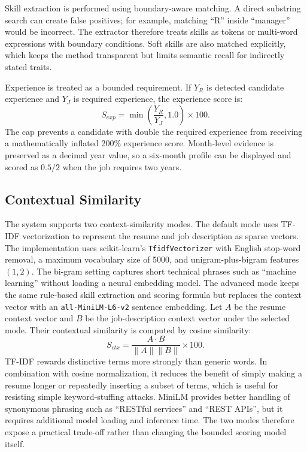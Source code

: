 Skill extraction is performed using boundary-aware matching. A direct substring search can create false positives; for example, matching ``R'' inside ``manager'' would be incorrect. The extractor therefore treats skills as tokens or multi-word expressions with boundary conditions. Soft skills are also matched explicitly, which keeps the method transparent but limits semantic recall for indirectly stated traits.

Experience is treated as a bounded requirement. If \(Y_R\) is detected candidate experience and \(Y_J\) is required experience, the experience score is:
\begin{equation}
S_{exp}=\min\left(\frac{Y_R}{Y_J},1.0\right)\times 100.
\end{equation}
The cap prevents a candidate with double the required experience from receiving a mathematically inflated 200\% experience score. Month-level evidence is preserved as a decimal year value, so a six-month profile can be displayed and scored as \(0.5/2\) when the job requires two years.

\subsection{Contextual Similarity}
The system supports two context-similarity modes. The default mode uses TF-IDF vectorization to represent the resume and job description as sparse vectors. The implementation uses scikit-learn's \texttt{TfidfVectorizer} with English stop-word removal, a maximum vocabulary size of 5000, and unigram-plus-bigram features \((1,2)\). The bi-gram setting captures short technical phrases such as ``machine learning'' without loading a neural embedding model. The advanced mode keeps the same rule-based skill extraction and scoring formula but replaces the context vector with an \texttt{all-MiniLM-L6-v2} sentence embedding. Let \(A\) be the resume context vector and \(B\) be the job-description context vector under the selected mode. Their contextual similarity is computed by cosine similarity:
\begin{equation}
S_{ctx}=\frac{A \cdot B}{\|A\|\|B\|}\times 100.
\end{equation}
TF-IDF rewards distinctive terms more strongly than generic words. In combination with cosine normalization, it reduces the benefit of simply making a resume longer or repeatedly inserting a subset of terms, which is useful for resisting simple keyword-stuffing attacks. MiniLM provides better handling of synonymous phrasing such as ``RESTful services'' and ``REST APIs'', but it requires additional model loading and inference time. The two modes therefore expose a practical trade-off rather than changing the bounded scoring model itself.

